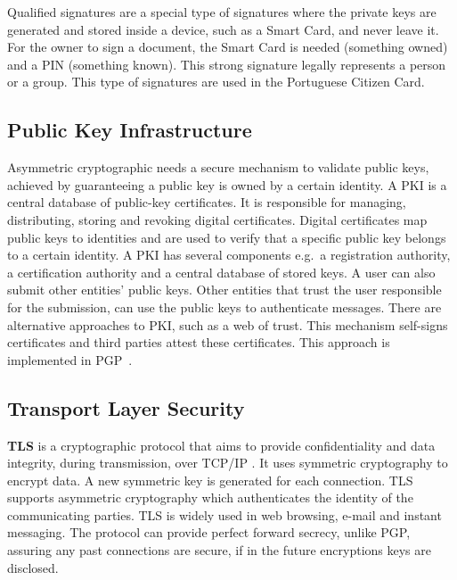 Qualified signatures are a special type of signatures where the private keys are generated and stored inside a device, such as a Smart Card, and never leave it. For the owner to sign a document, the Smart Card is needed (something owned) and a \ac{PIN} (something known). This strong signature legally represents a person or a group. This type of signatures are used in the Portuguese Citizen Card.

\subsection{Public Key Infrastructure}\label{chap:background:PKI}

Asymmetric cryptographic needs a secure mechanism to validate public keys, achieved by guaranteeing a public key is owned by a certain identity.
A \ac{PKI} is a central database of public-key certificates. It is responsible for managing, distributing, storing and revoking digital certificates. Digital certificates map public keys to identities and are used to verify that a specific public key belongs to a certain identity.
A \ac{PKI} has several components e.g.\ a registration authority, a certification authority and a central database of stored keys.
A user can also submit other entities' public keys. Other entities that trust the user responsible for the submission, can use the public keys to authenticate messages.
There are alternative approaches to \ac{PKI}, such as a web of trust. This mechanism self-signs certificates and third parties attest these certificates. This approach is implemented in \ac{PGP}~\cite{modelingPKI}.

\subsection{Transport Layer Security}\label{chap:background:TLS}

\textbf{\ac{TLS}} is a cryptographic protocol that aims to provide confidentiality and data integrity, during transmission, over TCP/IP \cite{rescorla2018transport}. It uses symmetric cryptography to encrypt data. A new symmetric key is generated for each connection.
\ac{TLS} supports asymmetric cryptography which authenticates the identity of the communicating parties.
\ac{TLS} is widely used in web browsing, e-mail and instant messaging.
The protocol can provide perfect forward secrecy, unlike \ac{PGP}, assuring any past connections are secure, if in the future encryptions keys are disclosed.



